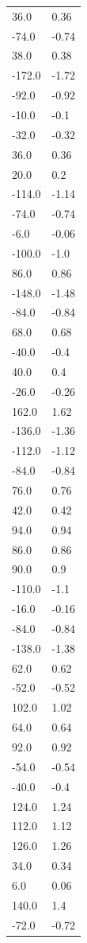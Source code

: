 \begin{longtable}{ll}
36.0 & 0.36 \\
-74.0 & -0.74 \\
38.0 & 0.38 \\
-172.0 & -1.72 \\
-92.0 & -0.92 \\
-10.0 & -0.1 \\
-32.0 & -0.32 \\
36.0 & 0.36 \\
20.0 & 0.2 \\
-114.0 & -1.14 \\
-74.0 & -0.74 \\
-6.0 & -0.06 \\
-100.0 & -1.0 \\
86.0 & 0.86 \\
-148.0 & -1.48 \\
-84.0 & -0.84 \\
68.0 & 0.68 \\
-40.0 & -0.4 \\
40.0 & 0.4 \\
-26.0 & -0.26 \\
162.0 & 1.62 \\
-136.0 & -1.36 \\
-112.0 & -1.12 \\
-84.0 & -0.84 \\
76.0 & 0.76 \\
42.0 & 0.42 \\
94.0 & 0.94 \\
86.0 & 0.86 \\
90.0 & 0.9 \\
-110.0 & -1.1 \\
-16.0 & -0.16 \\
-84.0 & -0.84 \\
-138.0 & -1.38 \\
62.0 & 0.62 \\
-52.0 & -0.52 \\
102.0 & 1.02 \\
64.0 & 0.64 \\
92.0 & 0.92 \\
-54.0 & -0.54 \\
-40.0 & -0.4 \\
124.0 & 1.24 \\
112.0 & 1.12 \\
126.0 & 1.26 \\
34.0 & 0.34 \\
6.0 & 0.06 \\
140.0 & 1.4 \\
-72.0 & -0.72 \\

\end{longtable}
